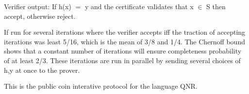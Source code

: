 \documentclass[12pt]{article}
\begin{document}
\vskip 0.3cm

Verifier output: If h(x) $=$ y and the certificate validates that x $\in$ S then accept, otherwise reject.

\vskip 0.3cm

If run for several iterations where the verifier accepts iff the traction of accepting iterations was least 5/16,
which is the mean of 3/8 and 1/4. The Chernoff bound shows that a constant number of iterations will ensure completeness
probability of at least 2/3. These iterations are run in parallel by sending several choices of h,y at once to the prover.

\vskip 0.3cm

This is the public coin interative protocol for the language QNR.
\end{document}
